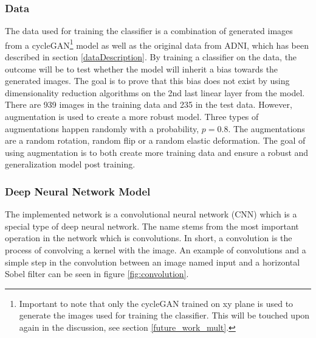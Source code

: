 \documentclass[12pt, fleqn, titlepage]{article}
\newcommand{\1}[1]{\mathds{1}\left[#1\right]}
\begin{document}
\subsubsection{Data}
The data used for training the classifier is a combination of generated images from a cycleGAN\footnote{Important to note that only the cycleGAN trained on xy plane is used to generate the images used for training the classifier. This will be touched upon again in the discussion, see section \ref{future_work_mult}.} model as well as the original data from ADNI, which has been described in section \ref{dataDescription}. By training a classifier on the data, the outcome will be to test whether the model will inherit a bias towards the generated images. The goal is to prove that this bias does not exist by using dimensionality reduction algorithms on the 2nd last linear layer from the model. There are 939 images in the training data and 235 in the test data. However, augmentation is used to create a more robust model. Three types of augmentations happen randomly with a probability, $ p = 0.8 $. The augmentations are a random rotation, random flip or a random elastic deformation. The goal of using augmentation is to both create more training data and ensure a robust and generalization model post training. 

\subsubsection{Deep Neural Network Model}

	The implemented network is a convolutional neural network (CNN) which is a special type of deep neural network. The name stems from the most important operation in the network which is convolutions. In short, a convolution is the process of convolving a kernel with the image. An example of convolutions and a simple step in the convolution between an image named input and a horizontal Sobel filter can be seen in figure \ref{fig:convolution}.
	
\end{document}
